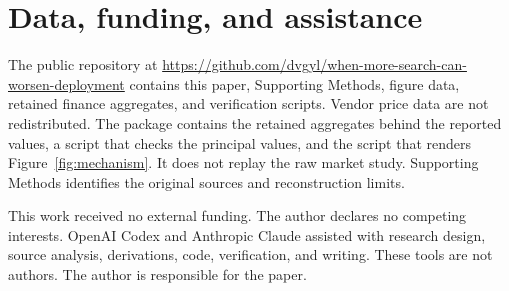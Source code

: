 \documentclass{article}
\begin{document}
\section*{Data, funding, and assistance}
The public repository at \url{https://github.com/dvgyl/when-more-search-can-worsen-deployment} contains this paper, Supporting Methods, figure data, retained finance aggregates, and verification scripts. Vendor price data are not redistributed. The package contains the retained aggregates behind the reported values, a script that checks the principal values, and the script that renders Figure~\ref{fig:mechanism}. It does not replay the raw market study. Supporting Methods identifies the original sources and reconstruction limits.

This work received no external funding. The author declares no competing interests. OpenAI Codex and Anthropic Claude assisted with research design, source analysis, derivations, code, verification, and writing. These tools are not authors. The author is responsible for the paper.


\clearpage

\end{document}
